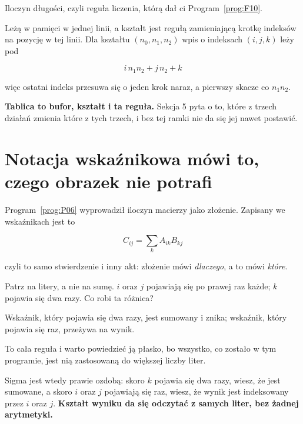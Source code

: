 \begin{fr}
Iloczyn długości, czyli reguła liczenia, którą dał ci Program~\ref{prog:F10}.

Leżą w pamięci w jednej linii, a kształt jest regułą zamieniającą krotkę
indeksów na pozycję w tej linii. Dla kształtu $(n_0, n_1, n_2)$ wpis o
indeksach $(i, j, k)$ leży pod

\[ i \, n_1 n_2 + j \, n_2 + k \]

więc ostatni indeks przesuwa się o jeden krok naraz, a pierwszy skacze co
$n_1 n_2$.

\textbf{Tablica to bufor, kształt i ta reguła.} Sekcja 5 pyta o to, które z
trzech działań zmienia które z tych trzech, i bez tej ramki nie da się jej
nawet postawić.
\end{fr}


\section{Notacja wskaźnikowa mówi to, czego obrazek nie potrafi}
\label{sec:P07-indices}

\begin{fr}
Program~\ref{prog:P06} wyprowadził iloczyn macierzy jako złożenie. Zapisany we
wskaźnikach jest to

\[ C_{ij} = \sum_k A_{ik} B_{kj} \]

czyli to samo stwierdzenie i inny akt: złożenie mówi \emph{dlaczego}, a to mówi
\emph{które}.

Patrz na litery, a nie na sumę. $i$ oraz $j$ pojawiają się po prawej raz każde;
$k$ pojawia się dwa razy. Co robi ta różnica?
\dotline
\nextframe
\end{fr}

\begin{fr}
\begin{ansblock}
Wskaźnik, który pojawia się dwa razy, jest sumowany i znika; wskaźnik, który
pojawia się raz, przeżywa na wynik.
\end{ansblock}

To cała reguła i warto powiedzieć ją płasko, bo wszystko, co zostało w tym
programie, jest nią zastosowaną do większej liczby liter.

Sigma jest wtedy prawie ozdobą: skoro $k$ pojawia się dwa razy, wiesz, że jest
sumowane, a skoro $i$ oraz $j$ pojawiają się raz, wiesz, że wynik jest
indeksowany przez $i$ oraz $j$. \textbf{Kształt wyniku da się odczytać z
samych liter, bez żadnej arytmetyki.}
\end{fr}

